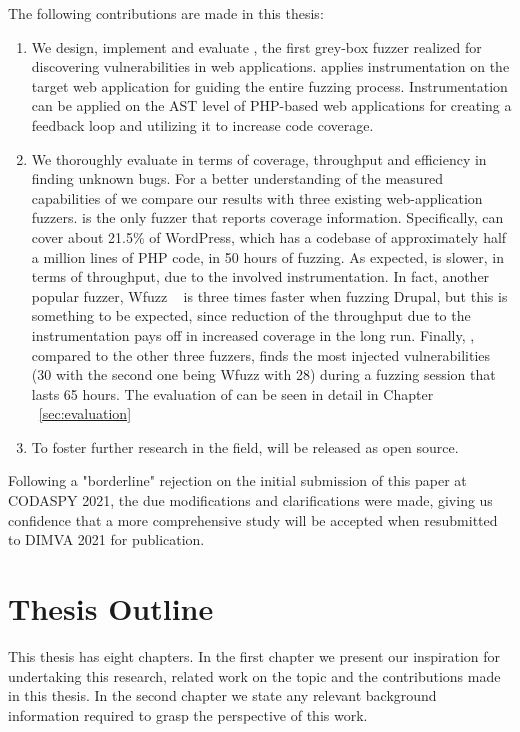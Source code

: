 The following contributions are made in this thesis:

\begin{enumerate}

\item We design, implement and evaluate \pname{}, the first grey-box fuzzer realized for discovering vulnerabilities in web applications. \pname{} applies instrumentation on the target web application for guiding the entire fuzzing process. Instrumentation can be applied on the AST level of PHP-based web applications for creating a feedback loop and utilizing it to increase code coverage.
\item We thoroughly evaluate \pname{} in terms of coverage, throughput and efficiency in finding unknown bugs. For a better understanding of the measured capabilities of \pname{} we compare our results with three existing web-application fuzzers. \pname{} is the only fuzzer that
reports coverage information. Specifically, \pname{} can cover about 21.5\% of WordPress, which has a codebase of approximately half a million lines of PHP code, in 50 hours of fuzzing. As expected, \pname{} is slower, in terms of throughput, due to the involved instrumentation. In fact, another popular fuzzer, Wfuzz ~\cite{wfuzz} is three times faster when fuzzing Drupal, but this is something to be expected, since reduction of the throughput due to the instrumentation pays off in increased coverage in the long run. Finally, \pname{}, compared to the other three fuzzers, finds the most injected vulnerabilities (30 with the second one being Wfuzz with 28) during a fuzzing session that lasts 65 hours. The evaluation of \pname{} can be seen in detail in Chapter ~\ref{sec:evaluation}
\item To foster further research in the field, \pname{} will be released as open source.

\end{enumerate}

Following a "borderline" rejection on the initial submission of this paper at CODASPY 2021, the due modifications and clarifications were made, giving us confidence that a more comprehensive study will be accepted when resubmitted to DIMVA 2021 for publication.

\section{Thesis Outline}
This thesis has eight chapters. In the first chapter we present our inspiration for undertaking this research, related work on the topic and the contributions made in this thesis. In the second chapter we state any relevant background information required to grasp the perspective of this work. 

